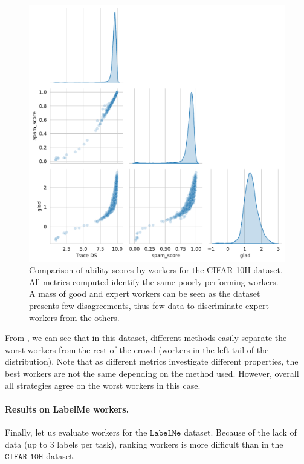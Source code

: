\begin{figure}[tbh]
    \centering
    \includegraphics[width=.8\textwidth]{./images_peerannot/fig-abilitiescifarh-output-1.pdf}
    \caption{Comparison of ability scores by workers for the CIFAR-10H dataset. All metrics computed identify the same poorly performing workers. A mass of good and expert workers can be seen as the dataset presents few disagreements, thus few data to discriminate expert workers from the others.}
    \label{fig:abilitiescifarh}
\end{figure}

From , we can see that in this dataset, different methods easily separate the worst workers from the rest of the crowd (workers in the left tail of the distribution).
Note that as different metrics investigate different properties, the best workers are not the same depending on the method used.
However, overall all strategies agree on the worst workers in this case.

\paragraph{Results on LabelMe workers.}
Finally, let us evaluate workers for the $\texttt{LabelMe}$ dataset.
Because of the lack of data (up to 3 labels per task), ranking workers is more difficult than in the $\texttt{CIFAR-10H}$ dataset.

